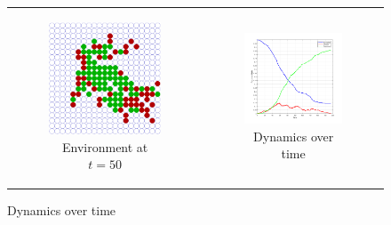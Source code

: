\begin{figure}
\begin{center}
	\begin{tabular}{c c}
		\begin{subfigure}[b]{0.2\textwidth}
			\centering
			\includegraphics[width=1\textwidth, angle=0]{./fig/SIR_Dunai/SIR_Dunai_dt001_environment.png}
			\caption{Environment at $t = 50$}
			\label{fig:sir_dunai_env}
		\end{subfigure}
    	
    	&
  
		\begin{subfigure}[b]{0.23\textwidth}
			\centering
			\includegraphics[width=1\textwidth, angle=0]{./fig/SIR_Dunai/SIR_Dunai_dt001.png}
			\caption{Dynamics over time}
			\label{fig:sir_dunai_env_dynamics}
		\end{subfigure}
	\end{tabular}
	

\end{center}
\end{figure}
